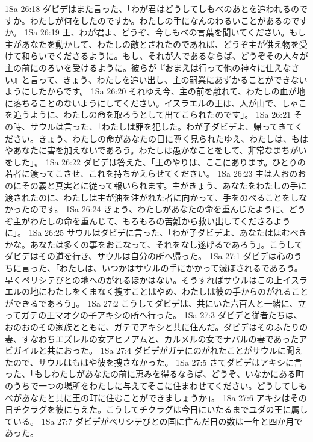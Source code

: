1Sa 26:18  ダビデはまた言った、「わが君はどうしてしもべのあとを追われるのですか。わたしが何をしたのですか。わたしの手になんのわるいことがあるのですか。
1Sa 26:19  王、わが君よ、どうぞ、今しもべの言葉を聞いてください。もし主があなたを動かして、わたしの敵とされたのであれば、どうぞ主が供え物を受けて和らいでくださるように。もし、それが人であるならば、どうぞその人々が主の前にのろいを受けるように。彼らが『おまえは行って他の神々に仕えなさい』と言って、きょう、わたしを追い出し、主の嗣業にあずかることができないようにしたからです。
1Sa 26:20  それゆえ今、主の前を離れて、わたしの血が地に落ちることのないようにしてください。イスラエルの王は、人が山で、しゃこを追うように、わたしの命を取ろうとして出てこられたのです」。
1Sa 26:21  その時、サウルは言った、「わたしは罪を犯した。わが子ダビデよ、帰ってきてください。きょう、わたしの命があなたの目に尊く見られたゆえ、わたしは、もはやあなたに害を加えないであろう。わたしは愚かなことをして、非常なまちがいをした」。
1Sa 26:22  ダビデは答えた、「王のやりは、ここにあります。ひとりの若者に渡ってこさせ、これを持ちかえらせてください。
1Sa 26:23  主は人おのおのにその義と真実とに従って報いられます。主がきょう、あなたをわたしの手に渡されたのに、わたしは主が油を注がれた者に向かって、手をのべることをしなかったのです。
1Sa 26:24  きょう、わたしがあなたの命を重んじたように、どうぞ主がわたしの命を重んじて、もろもろの苦難から救い出してくださるように」。
1Sa 26:25  サウルはダビデに言った、「わが子ダビデよ、あなたはほむべきかな。あなたは多くの事をおこなって、それをなし遂げるであろう」。こうしてダビデはその道を行き、サウルは自分の所へ帰った。
1Sa 27:1  ダビデは心のうちに言った、「わたしは、いつかはサウルの手にかかって滅ぼされるであろう。早くペリシテびとの地へのがれるほかはない。そうすればサウルはこの上イスラエルの地にわたしをくまなく捜すことはやめ、わたしは彼の手からのがれることができるであろう」。
1Sa 27:2  こうしてダビデは、共にいた六百人と一緒に、立ってガテの王マオクの子アキシの所へ行った。
1Sa 27:3  ダビデと従者たちは、おのおのその家族とともに、ガテでアキシと共に住んだ。ダビデはそのふたりの妻、すなわちエズレルの女アヒノアムと、カルメルの女でナバルの妻であったアビガイルと共におった。
1Sa 27:4  ダビデがガテにのがれたことがサウルに聞えたので、サウルはもはや彼を捜さなかった。
1Sa 27:5  さてダビデはアキシに言った、「もしわたしがあなたの前に恵みを得るならば、どうぞ、いなかにある町のうちで一つの場所をわたしに与えてそこに住まわせてください。どうしてしもべがあなたと共に王の町に住むことができましょうか」。
1Sa 27:6  アキシはその日チクラグを彼に与えた。こうしてチクラグは今日にいたるまでユダの王に属している。
1Sa 27:7  ダビデがペリシテびとの国に住んだ日の数は一年と四か月であった。
